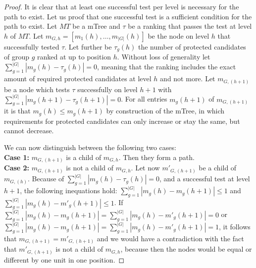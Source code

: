 %
\begin{proof}
	\label{proof:lazy-mTree-test}
	It is clear that at least one successful test per level is necessary for the path to exist.
	Let us proof that one successful test is a sufficient condition for the path to exist.
	Let $MT$ be a mTree and $\tau$ be a ranking that passes the test at level $h$ of $MT$.
	Let $m_{G,h}=[m_{1}(h), \ldots, m_{|G|}(h)]$ be the node on level $h$ that successfully tested $\tau$.
	Let further be $\tau_g(h)$ the number of protected candidates of group $g$ ranked at up to position $h$.
	Without loss of generality let $\sum_{g=1}^{|G|} |m_{g}(h) - \tau_{g}(h)| = 0$, meaning that the ranking includes the exact amount of required protected candidates at level $h$ and not more.
	Let $m_{G,(h+1)}$ be a node which tests $\tau$ successfully on level $h+1$ with $\sum_{g=1}^{|G|} |m_{g}(h+1) - \tau_{g}(h+1)| = 0$.
	For all entries $m_{g}(h+1)$ of $m_{G,(h+1)}$ it is that $m_{g}(h) \leq m_{g}(h+1)$ by construction of the mTree, in which requirements for protected candidates can only increase or stay the same, but cannot decrease.

	\noindent We can now distinguish between the following two cases:
	\\
	\textbf{Case 1:} $m_{G,(h+1)}$ is a child of $m_{G,h}$.
	Then they form a path. %
	\\
	\textbf{Case 2:} $m_{G,(h+1)}$ is not a child of $m_{G,h}$.
	Let now ${m'}_{G,(h+1)}$ be a child of $m_{G,(h)}$.
	Because of $\sum_{g=1}^{|G|} |m_{g}(h) - \tau_{g}(h)| = 0$, and a successful test at level $h+1$, the following inequations hold: $\sum_{g=1}^{|G|} |m_{g}(h) - m_g(h+1)| \leq 1$ and $\sum_{g=1}^{|G|} |m_{g}(h) - m'_g(h+1)| \leq 1$.
	If $\sum_{g=1}^{|G|} |m_{g}(h) - m_g(h+1)| = \sum_{g=1}^{|G|} |m_{g}(h) - m'_g(h+1)| = 0$ or $\sum_{g=1}^{|G|} |m_{g}(h) - m_g(h+1)| = \sum_{g=1}^{|G|} |m_{g}(h) - m'_g(h+1)| = 1$, it follows that $m_{G,(h+1)} = {m'}_{G,(h+1)}$ and we would have a contradiction with the fact that ${m'}_{G,(h+1)}$ is not a child of $m_{G,h}$, because then the nodes would be equal or different by one unit in one position.


\end{proof}
